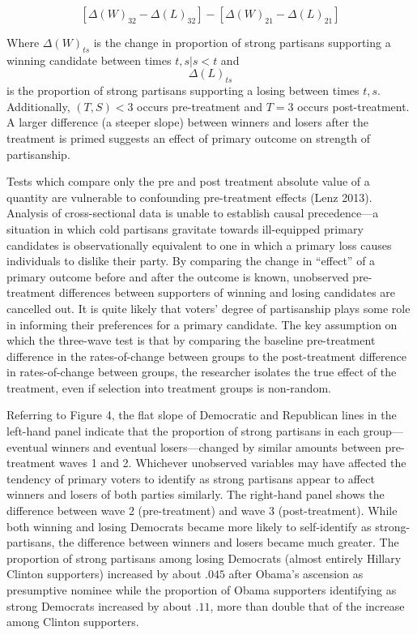 \documentclass[
]{article}
\begin{document}
\[
[\Delta(W)_{32} - \Delta(L)_{32}]-[\Delta(W)_{21} - \Delta(L)_{21}] 
\]

Where \(\Delta(W)_{ts}\) is the change in proportion of strong partisans supporting a winning candidate between times \(t, s | s<t\) and \[\Delta(L)_{ts}\] is the proportion of strong partisans supporting a losing between times \(t, s\). Additionally, \((T,S) < 3\) occurs pre-treatment and \(T=3\) occurs post-treatment. A larger difference (a steeper slope) between winners and losers after the treatment is primed suggests an effect of primary outcome on strength of partisanship.

Tests which compare only the pre and post treatment absolute value of a quantity are vulnerable to confounding pre-treatment effects (Lenz 2013). Analysis of cross-sectional data is unable to establish causal precedence---a situation in which cold partisans gravitate towards ill-equipped primary candidates is observationally equivalent to one in which a primary loss causes individuals to dislike their party. By comparing the change in ``effect'' of a primary outcome before and after the outcome is known, unobserved pre-treatment differences between supporters of winning and losing candidates are cancelled out. It is quite likely that voters' degree of partisanship plays some role in informing their preferences for a primary candidate. The key assumption on which the three-wave test is that by comparing the baseline pre-treatment difference in the rates-of-change between groups to the post-treatment difference in rates-of-change between groups, the researcher isolates the true effect of the treatment, even if selection into treatment groups is non-random.

Referring to Figure 4, the flat slope of Democratic and Republican lines in the left-hand panel indicate that the proportion of strong partisans in each group---eventual winners and eventual losers---changed by similar amounts between pre-treatment waves 1 and 2. Whichever unobserved variables may have affected the tendency of primary voters to identify as strong partisans appear to affect winners and losers of both parties similarly. The right-hand panel shows the difference between wave 2 (pre-treatment) and wave 3 (post-treatment). While both winning and losing Democrats became more likely to self-identify as strong-partisans, the difference between winners and losers became much greater. The proportion of strong partisans among losing Democrats (almost entirely Hillary Clinton supporters) increased by about \(.045\) after Obama's ascension as presumptive nominee while the proportion of Obama supporters identifying as strong Democrats increased by about \(.11\), more than double that of the increase among Clinton supporters.
\end{document}
